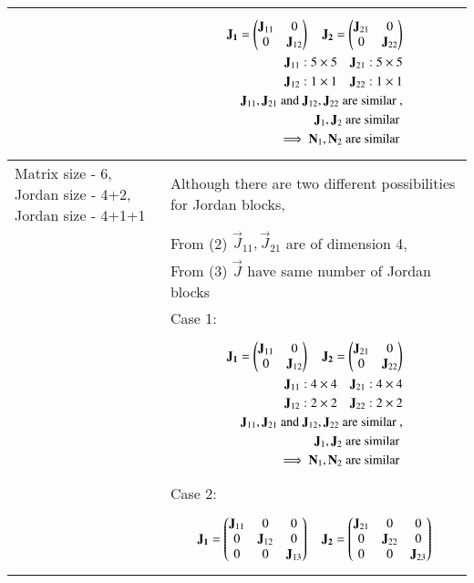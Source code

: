 \begin{longtable}{|p{5cm}|p{13cm}|}
\\&
\parbox{12cm}{\begin{align*}
    \mathbf{J_1}=\begin{pmatrix}\mathbf{J}_{11} & 0 \\ 0&\mathbf{J}_{12}\end{pmatrix} \quad \mathbf{J_2}=\begin{pmatrix}\mathbf{J}_{21} & 0 \\ 0&\mathbf{J}_{22}\end{pmatrix}\\
    \mathbf{J}_{11}: 5\times5 \quad \mathbf{J}_{21}: 5\times5\\
    \mathbf{J}_{12}: 1\times1 \quad \mathbf{J}_{22}: 1\times1\\
    \mathbf{J}_{11}, \mathbf{J}_{21} \text{ and } \mathbf{J}_{12}, \mathbf{J}_{22} \text{ are similar }, \\
    \mathbf{J}_{1}, \mathbf{J}_{2} \text{ are similar }\\
    \implies \mathbf{N}_{1}, \mathbf{N}_{2} \text{ are similar }
\end{align*}}\\
\hline
Matrix size - 6, Jordan size - 4+2, Jordan size - 4+1+1 & Although there are two different possibilities for Jordan blocks,\\& From (2) $\vec{J}_{11}, \vec{J}_{21} $ are of dimension 4, \\& From (3) $\vec{J}$ have same number of Jordan blocks
\\& Case 1: 
\\&
\parbox{12cm}{\begin{align*}
    \mathbf{J_1}=\begin{pmatrix}\mathbf{J}_{11} & 0 \\ 0&\mathbf{J}_{12}\end{pmatrix} \quad \mathbf{J_2}=\begin{pmatrix}\mathbf{J}_{21} & 0 \\ 0&\mathbf{J}_{22}\end{pmatrix}\\
    \mathbf{J}_{11}: 4\times4 \quad \mathbf{J}_{21}: 4\times4\\
    \mathbf{J}_{12}: 2\times2 \quad \mathbf{J}_{22}: 2\times2\\
    \mathbf{J}_{11}, \mathbf{J}_{21} \text{ and } \mathbf{J}_{12}, \mathbf{J}_{22} \text{ are similar }, \\
    \mathbf{J}_{1}, \mathbf{J}_{2} \text{ are similar }\\
    \implies \mathbf{N}_{1}, \mathbf{N}_{2} \text{ are similar }
\end{align*}}
\\& Case 2: 
\\&
\parbox{12cm}{\begin{align*}
    \vec{J_1}=\myvec{\vec{J}_{11} & 0&0 \\ 0&\vec{J}_{12}&0\\0&0&\vec{J}_{13}} \quad \vec{J_2}=\myvec{\vec{J}_{21} & 0&0 \\ 0&\vec{J}_{22}&0\\0&0&\vec{J}_{23}}\\

\end{align*}}
\end{longtable}
